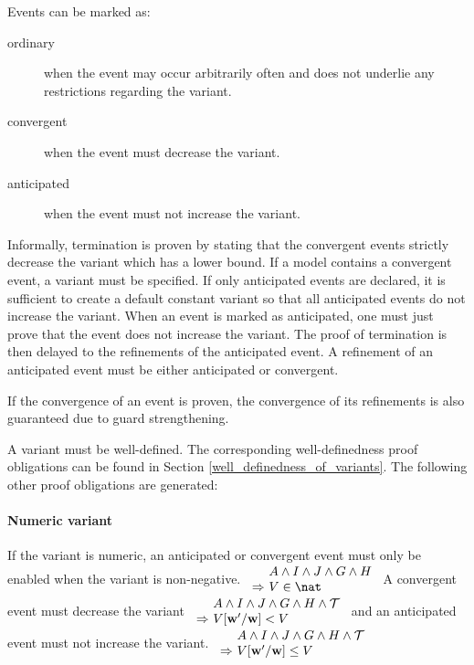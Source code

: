Events can be marked as:
\begin{description}
\item[ordinary] when the event may occur arbitrarily often and does not underlie any restrictions
  regarding the variant.
\item[convergent] when the event must decrease the variant.
\item[anticipated] when the event must not increase the variant.
\end{description}
Informally, termination is proven by stating that the convergent events strictly decrease the variant
  which has a lower bound.
If a model contains a convergent event, a variant must be specified.
If only anticipated events are declared, it is sufficient to create a default constant variant so
  that all anticipated events do not increase the variant.
When an event is marked as anticipated, one must just prove that the event does not increase the
  variant.
The proof of termination is then delayed to the refinements of the anticipated event.
A refinement of an anticipated event must be either anticipated or convergent.

If the convergence of an event is proven, the convergence of its refinements is also guaranteed due to guard strengthening.

A variant must be well-defined. The corresponding well-definedness proof obligations
  can be found in Section \ref{well_definedness_of_variants}.
The following other proof obligations are generated:

\paragraph{Numeric variant}
\label{numeric_variant}
  If the variant is numeric, an anticipated or convergent event
  must only be enabled when the variant is non-negative.
%
  {$\begin{array}{r@{\ }l}
      & A \land I \land J \land G \land H \\
      \limp & V\in\nat
    \end{array}$}
A convergent event must decrease the variant
%
  {$\begin{array}{r@{\ }l}
      & A \land I \land J \land G \land H \land \concbeforeafter \\
      \limp & V[\varlist{w}'/\varlist{w}]<V
    \end{array}$}
and an anticipated event must not increase the variant.
%
  {$\begin{array}{r@{\ }l}
      & A \land I \land J \land G \land H \land \concbeforeafter \\
      \limp & V[\varlist{w}'/\varlist{w}]\leq V
    \end{array}$}

